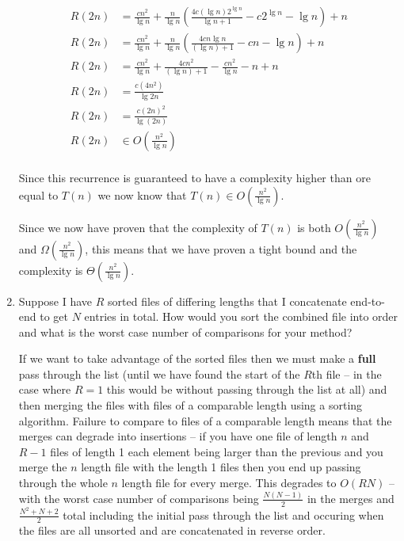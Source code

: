 \documentclass[10pt,\jkfside,a4paper]{article}
\begin{document}
\begin{enumerate}
\begin{equation}
\begin{split}
R(2n) &= \frac{cn^2}{\lg n} + \frac{n}{\lg n}\left(\frac{4c(\lg n)2^{\lg n}}{\lg n + 1} - c2^{\lg n} - \lg n \right) + n \\
R(2n) &= \frac{cn^2}{\lg n} + \frac{n}{\lg n}\left(\frac{4cn \lg n}{(\lg n) + 1} - cn - \lg n\right) + n \\
R(2n) &= \frac{cn^2}{\lg n} + \frac{4cn^2}{(\lg n) + 1} - \frac{cn^2}{\lg n} - n + n \\
R(2n) &= \frac{c(4n^2)}{\lg 2n} \\
R(2n) &= \frac{c(2n)^2}{\lg(2n)} \\
R(2n) &\in O\left(\frac{n^2}{\lg n}\right) \\
\end{split}
\end{equation}

Since this recurrence is guaranteed to have a complexity higher than ore equal to 
$T(n)$ we now know that $T(n) \in O(\frac{n^2}{\lg n})$.

Since we now have proven that the complexity of $T(n)$ is both $O(\frac{n^2}{\lg n})$ and 
$\Omega(\frac{n^2}{\lg n})$, this means that we have proven a tight bound and the complexity is $\Theta(\frac{n^2}{\lg n})$.

\item Suppose I have $R$ sorted files of differing lengths that I concatenate end-to-end 
to get $N$ entries in total. How would you sort the combined file into order and what is 
the worst case number of comparisons for your method?

If we want to take advantage of the sorted files then we must make a \textbf{full} pass through 
the list (until we have found the start of the $R$th file -- in the case where $R = 1$ this would 
be without passing through the list at all) and then merging the files 
with files of a comparable length using a sorting algorithm. Failure to compare to files of 
a comparable length means that the merges can degrade into insertions -- if you have one 
file of length $n$ and $R - 1$ files of length 1 each element being larger than the previous 
and you merge the $n$ length file with the length 1 files then you end up passing through the 
whole $n$ length file for every merge. This degrades to $O(RN)$ -- with the worst case number 
of comparisons being $\frac{N(N - 1)}{2}$ in the merges and $\frac{N^2 + N + 2}{2}$ total including 
the initial pass through the list and occuring when the files are all unsorted and are 
concatenated in reverse order.


\end{enumerate}
\end{document}
